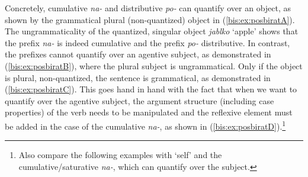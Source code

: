 \documentclass[output=paper]{langscibook}
\begin{document}
Concretely, cumulative \textit{na-} and distributive \textit{po-} can quantify over an object, as shown by the grammatical plural (non-quantized) object in (\ref{bis:ex:posbiratA}). The ungrammaticality of the quantized, singular object \textit{jablko} ‘apple’ shows that the prefix \textit{na-} is indeed cumulative and the prefix \textit{po-} distributive. In contrast, the prefixes cannot quantify over an agentive subject, as demonstrated in (\ref{bis:ex:posbiratB}), where the plural subject is ungrammatical. Only if the object is plural, non-quantized, the sentence is grammatical, as demonstrated in (\ref{bis:ex:posbiratC}). This goes hand in hand with the fact that when we want to quantify over the agentive subject, the argument structure (including case properties) of the verb needs to be manipulated and the reflexive element must be added in the case of the cumulative \textit{na-}, as shown in (\ref{bis:ex:posbiratD}).\footnote{Also compare the following examples with ‘self’ and the cumulative/saturative \textit{na-}, which can quantify over the subject.
\ea
{}
\z
\z
}

\ea\label{bis:ex:posbirat}
\end{document}
